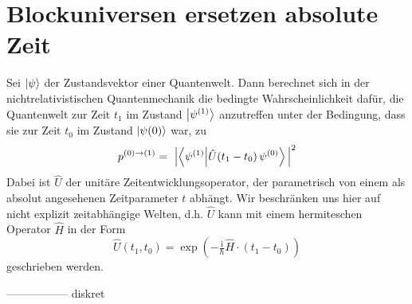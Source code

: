 \documentclass[12pt]{article}
\begin{document}
\section{Blockuniversen ersetzen absolute Zeit}
Sei $\ket{\psi}$ der Zustandsvektor einer Quantenwelt. Dann berechnet sich in der nichtrelativistischen Quantenmechanik die bedingte Wahrscheinlichkeit dafür, die Quantenwelt zur Zeit $t_1$ im Zustand $\ket{\psi^{(1)}}$ anzutreffen unter der Bedingung, dass sie zur Zeit $t_0$ im Zustand  $\ket{\psi{(0)}}$ war, zu
\begin{equation} 
\label{eq:conditional_probability}
p^{(0)\rightarrow(1)} =\ \Bigl| \bra{\psi^{(1)}}\ket{\hat{U}(t_1-t_0)\,\psi^{(0)}} \Bigl|^2
\end{equation}
Dabei ist $\hat{U}$ der unitäre Zeitentwicklungsoperator, der parametrisch von einem als absolut angesehenen Zeitparameter $t$ abhängt. Wir beschränken uns hier auf nicht explizit zeitabhängige Welten, d.h. $\hat{U}$ kann mit einem hermiteschen Operator $\hat{H}$ in der Form
\begin{equation}
\label{eq:time_evolution}
\hat{U}(t_1,t_0)=\exp \left(-\tfrac {\mathrm {i} }{\hbar}\hat{H}\cdot (t_1-t_0)\right)
\end{equation}
geschrieben werden. 


-----------------
diskret
\end{document}
